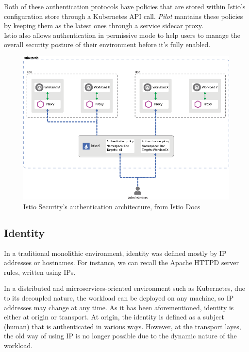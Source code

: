 \noindent Both of these authentication protocols have policies that are stored within Istio's configuration store through a Kubernetes API call. \textit{Pilot} mantains these policies by keeping them as the latest ones through a service sidecar proxy. \\Istio also allows authentication in permissive mode to help users to manage the overall security posture of their environment before it's fully enabled.    

\begin{figure}
    \centering
    \includegraphics[scale=0.55]{chapters/images/chp2/arch-auth.png}
    \caption{Istio Security's authentication architecture, from Istio Docs}
    \label{fig:autharc}
\end{figure}

\subsection{Identity}
In a traditional monolithic environment, identity was defined mostly by IP addresses or hostnames. For instance, we can recall the Apache HTTPD server rules, written using IPs.

In a distributed and microservices-oriented environment such as Kubernetes, due to its decoupled nature, the workload can be deployed on any machine, so IP addresses may change at any time. As it has been aforementioned, identity is either at origin or transport. At origin, the identity is defined as a subject (human) that is authenticated in various ways. However, at the transport layes, the old way of using IP is no longer possible due to the dynamic nature of the workload.

